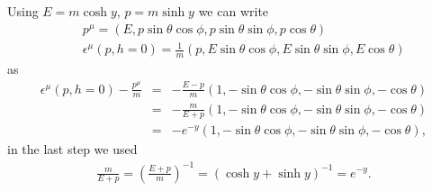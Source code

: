 \documentclass[11pt]{article}
\def\eps{\epsilon}
\begin{document}
\section{ }
Using $E = m\cosh y$, $p = m\sinh y$ we can write 
\begin{eqnarray}
    &&p^\mu
    = (E, p\sin\theta\cos\phi, p\sin\theta\sin\phi, p\cos\theta) \\
    &&\eps^\mu(p,h=0)
    = \frac{1}{m}(p, E\sin\theta\cos\phi, E\sin\theta\sin\phi, E\cos\theta)  
\end{eqnarray}
as
\begin{eqnarray}
    \eps^\mu(p,h=0) - \frac{p^\mu}{m}
  &=& -\frac{E-p}{m} (1, -\sin\theta\cos\phi, -\sin\theta\sin\phi, -\cos\theta) \\
  &=& -\frac{m}{E+p} (1, -\sin\theta\cos\phi, -\sin\theta\sin\phi, -\cos\theta) \\
  &=& -e^{-y}  (1, -\sin\theta\cos\phi, -\sin\theta\sin\phi, -\cos\theta),
\end{eqnarray}
in the last step we used
\begin{eqnarray}
    \frac{m}{E+p}=\left(\frac{E+p}{m}\right)^{-1} = (\cosh y +\sinh y)^{-1}= e^{-y} .
\end{eqnarray}
\end{document}
